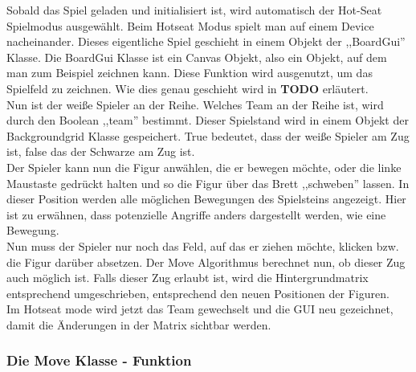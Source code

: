\documentclass[12pt,a4paper]{article}
\begin{document}
{Sobald das Spiel geladen und initialisiert ist, wird automatisch der Hot-Seat Spielmodus ausgewählt. Beim Hotseat Modus spielt man auf einem Device nacheinander. Dieses eigentliche Spiel geschieht in einem Objekt der ,,BoardGui'' Klasse. Die BoardGui Klasse ist ein Canvas Objekt, also ein Objekt, auf dem man zum Beispiel zeichnen kann. Diese Funktion wird ausgenutzt, um das Spielfeld zu zeichnen. Wie dies genau geschieht wird in \textbf{TODO} erläutert.  \\
Nun ist der weiße Spieler an der Reihe. Welches Team an der Reihe ist, wird durch den Boolean ,,team'' bestimmt. Dieser Spielstand wird in einem Objekt der Backgroundgrid Klasse gespeichert. True bedeutet, dass der weiße Spieler am Zug ist, false das der Schwarze am Zug ist. \\
Der Spieler kann nun die Figur anwählen, die er bewegen möchte, oder die linke Maustaste gedrückt halten und so die Figur über das Brett ,,schweben'' lassen. In dieser Position werden alle möglichen Bewegungen des Spielsteins angezeigt. Hier ist zu erwähnen, dass potenzielle Angriffe anders dargestellt werden, wie eine Bewegung. \\
Nun muss der Spieler nur noch das Feld, auf das er ziehen möchte, klicken bzw. die Figur darüber absetzen. Der Move Algorithmus berechnet nun, ob dieser Zug auch möglich ist. Falls dieser Zug erlaubt ist, wird die Hintergrundmatrix entsprechend umgeschrieben, entsprechend den neuen Positionen der Figuren. \\
Im Hotseat mode wird jetzt das Team gewechselt und die GUI neu gezeichnet, damit die Änderungen in der Matrix sichtbar werden. 

\subsubsection{Die Move Klasse - Funktion}
\label{SUBSUBSEC:MOVE}

}
\end{document}
